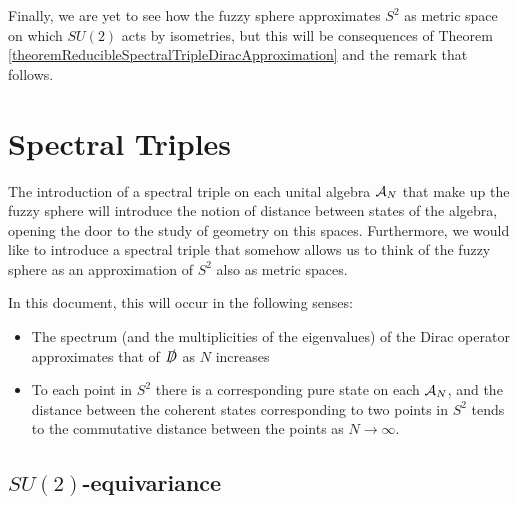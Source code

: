 Finally, we are yet to see how the fuzzy sphere approximates $S^2$ as metric space on which $SU(2)$ acts by isometries, but this will be consequences of Theorem \ref{theoremReducibleSpectralTripleDiracApproximation} and the remark that follows.

\section{Spectral Triples}
\label{CHFSSectionSpectralTriples}

The introduction of a spectral triple on each unital algebra $\mathcal A_N$ that make up the fuzzy sphere will introduce the notion of distance between states of the algebra, opening the door to the study of geometry on this spaces. Furthermore, we would like to introduce a spectral triple that somehow allows us to think of the fuzzy sphere as an approximation of $S^2$ also as metric spaces. 

In this document, this will occur in the following senses:

    \begin{itemize}
    
    \item The spectrum (and the multiplicities of the eigenvalues) of the Dirac operator approximates that of $\slashed D$ as $N$ increases
    
    \item To each point in $S^2$ there is a corresponding pure state on each $\mathcal A_N$, and the distance between the coherent states corresponding to two points in $S^2$ tends to the commutative distance between the points as $N \to \infty$.
    
    \end{itemize}

\subsection{$SU(2)$-equivariance}



